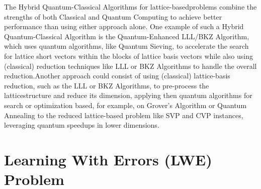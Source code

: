 \documentclass[runningheads]{llncs}
\numberwithin{equation}{section}
\begin{document}
\begin{enumerate}
        The Hybrid Quantum-Classical Algorithms \cite{kirshanova-et-al:quantum-algorithms-approximate-k-list-problem-application-lattice-sieving:2019:06-2024,albrecht-et-al:variational-quantum-solutions-shortest-vector-problem:2023:06-2024} for lattice-based\break problems combine the strengths of both Classical and Quantum Computing to achieve better performance than using either approach alone. One example of such a Hybrid Quantum-Classical Algorithm is the Quantum-Enhanced LLL/BKZ Algorithm, which uses quantum algorithms, like Quantum Sieving\break \cite{laarhoven-mosca-van-de-pol:finding-shortest-lattice-vectors-faster-using-quantum-search:2015:06-2024,kirshanova-et-al:quantum-algorithms-approximate-k-list-problem-application-lattice-sieving:2019:06-2024,chailloux-loyer:lattice-sieving-via-quantum-walks:2021:06-2024}, to accelerate the search for lattice short vectors within the blocks of lattice basis vectors while also using (classical) reduction techniques like LLL \cite{lenstra-lenstra-lovasz:factoring-polynomials-with-rational-coefficients:1982:06-2024} or BKZ \cite{yasuda:survey-solving-svp-algorithms-recent-strategies-solving-svp-challenge:2021:06-2024,schnorr-euchner:lattice-basis-reduction-improved-practical-algorithms-and-solving-subset-sum-problems:1994:06-2024} Algorithms to handle the overall reduction.\break Another approach could consist of using (classical) lattice-basis reduction, such as the LLL \cite{lenstra-lenstra-lovasz:factoring-polynomials-with-rational-coefficients:1982:06-2024} or BKZ \cite{yasuda:survey-solving-svp-algorithms-recent-strategies-solving-svp-challenge:2021:06-2024,schnorr-euchner:lattice-basis-reduction-improved-practical-algorithms-and-solving-subset-sum-problems:1994:06-2024} Algorithms, to pre-process the lattice\break structure and reduce its dimension, applying then quantum algorithms for search or optimization based, for example, on Grover's Algorithm \cite{grover:fast-quantum-mechanical-algorithm-database-search:1996:06-2024} or Quantum Annealing \cite{joseph-et-al:two-quantum-ising-algorithms-shortest-vector-problem:2021:06-2024,raavi-et-al:security-comparisons-performance-analyses-post-quantum-signature-algorithms:2021:06-2024,yamaguchi-et-al:annealing-based-algorithm-solving-cvp-svp:2022:06-2024} to the reduced lattice-based problem like SVP and CVP instances, leveraging quantum speedups in lower dimensions.
        
    \end{enumerate}

    
    \section{Learning With Errors (LWE) Problem}
    \label{sec:learning-with-errors-problem}
\end{document}

